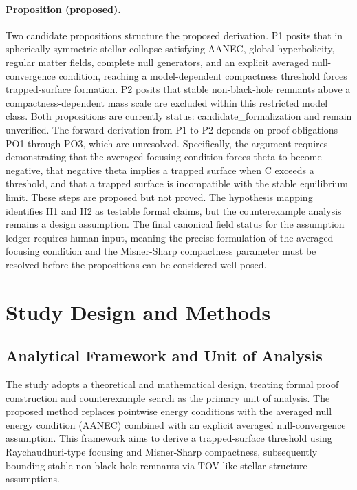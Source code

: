 \documentclass[conference]{IEEEtran}
\begin{document}
\paragraph{Proposition (proposed).} Two candidate propositions structure the proposed derivation. P1 posits that in spherically symmetric stellar collapse satisfying AANEC, global hyperbolicity, regular matter fields, complete null generators, and an explicit averaged null-convergence condition, reaching a model-dependent compactness threshold forces trapped-surface formation. P2 posits that stable non-black-hole remnants above a compactness-dependent mass scale are excluded within this restricted model class. Both propositions are currently status: candidate\_formalization and remain unverified. The forward derivation from P1 to P2 depends on proof obligations PO1 through PO3, which are unresolved. Specifically, the argument requires demonstrating that the averaged focusing condition forces theta to become negative, that negative theta implies a trapped surface when C exceeds a threshold, and that a trapped surface is incompatible with the stable equilibrium limit. These steps are proposed but not proved. The hypothesis mapping identifies H1 and H2 as testable formal claims, but the counterexample analysis remains a design assumption. The final canonical field status for the assumption ledger requires human input, meaning the precise formulation of the averaged focusing condition and the Misner-Sharp compactness parameter must be resolved before the propositions can be considered well-posed.

\section{Study Design and Methods}
\subsection{Analytical Framework and Unit of Analysis}
The study adopts a theoretical and mathematical design, treating formal proof construction and counterexample search as the primary unit of analysis. The proposed method replaces pointwise energy conditions with the averaged null energy condition (AANEC) combined with an explicit averaged null-convergence assumption. This framework aims to derive a trapped-surface threshold using Raychaudhuri-type focusing and Misner-Sharp compactness, subsequently bounding stable non-black-hole remnants via TOV-like stellar-structure assumptions.
\end{document}
